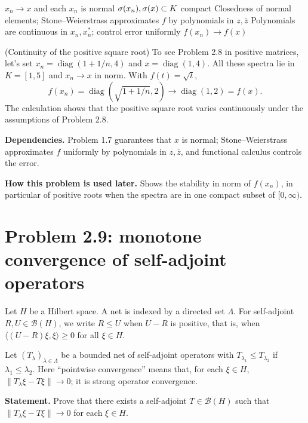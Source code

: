 \proofdiagrambranch
{$x_n\to x$ and each $x_n$ is normal}
{$\sigma(x_n),\sigma(x)\subset K$ compact}
{Closedness of normal elements; Stone--Weierstrass approximates $f$ by polynomials in $z,\bar z$}
{Polynomials are continuous in $x_n,x_n^*$; control error uniformly}
{$f(x_n)\to f(x)$}

\begin{cthejemplo}{(Continuity of the positive square root)}
To see Problem 2.8 in positive matrices, let's set
$x_n=\operatorname{diag}(1+1/n,4)$ and $x=\operatorname{diag}(1,4)$.
All these spectra lie in $K=[1,5]$ and $x_n\to x$ in norm.
With $f(t)=\sqrt t$,
\[
 f(x_n)=\operatorname{diag}(\sqrt{1+1/n},2)
 \longrightarrow\operatorname{diag}(1,2)=f(x).
\]
The calculation shows that the positive square root varies continuously under the assumptions of Problem 2.8.
\end{cthejemplo}

\noindent\textbf{Dependencies.} Problem 1.7 guarantees that $x$ is normal; Stone--Weierstrass approximates $f$ uniformly by polynomials in $z,\overline z$, and functional calculus controls the error.

\noindent\textbf{How this problem is used later.} Shows the stability in norm of $f(x_n)$, in particular of positive roots when the spectra are in one compact subset of $[0,\infty)$.

\section{Problem 2.9: monotone convergence of self-adjoint operators}

Let $H$ be a Hilbert space. A net is indexed by a directed set $\Lambda$.
For self-adjoint $R,U\in\mathcal B(H)$, we write $R\le U$ when $U-R$ is positive,
that is, when $\langle(U-R)\xi,\xi\rangle\ge0$ for all $\xi\in H$.


Let $(T_\lambda)_{\lambda\in\Lambda}$ be a bounded net of self-adjoint operators with
$T_{\lambda_1}\le T_{\lambda_2}$ if $\lambda_1\le\lambda_2$.
Here ``pointwise convergence'' means that, for each $\xi\in H$,
$\|T_\lambda\xi-T\xi\|\to0$; it is strong operator convergence.

\noindent\textbf{Statement.} Prove that there exists a self-adjoint $T\in\mathcal B(H)$ such that $\|T_\lambda\xi-T\xi\|\to0$ for each $\xi\in H$.

